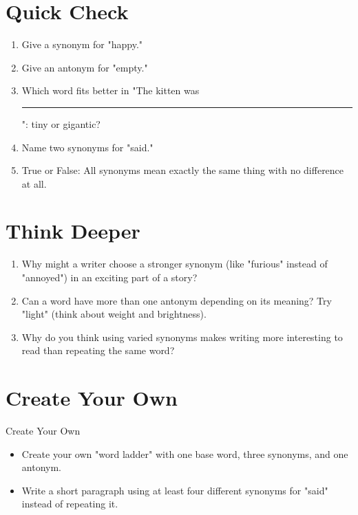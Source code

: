 \section{Quick Check}
\begin{quickcheck}
\begin{enumerate}
    \item Give a synonym for "happy."
    \item Give an antonym for "empty."
    \item Which word fits better in "The kitten was \rule{2cm}{0.4pt}": tiny or gigantic?
    \item Name two synonyms for "said."
    \item True or False: All synonyms mean exactly the same thing with no difference at all.
\end{enumerate}
\end{quickcheck}

\section{Think Deeper}
\begin{challengebox}
\begin{enumerate}
    \item Why might a writer choose a stronger synonym (like "furious" instead of "annoyed") in an exciting part of a story?
    \item Can a word have more than one antonym depending on its meaning? Try "light" (think about weight and brightness).
    \item Why do you think using varied synonyms makes writing more interesting to read than repeating the same word?
\end{enumerate}
\end{challengebox}

\section{Create Your Own}
\begin{activitybox}{Create Your Own}
\begin{itemize}
    \item Create your own "word ladder" with one base word, three synonyms, and one antonym.
    \item Write a short paragraph using at least four different synonyms for "said" instead of repeating it.
\end{itemize}
\end{activitybox}

